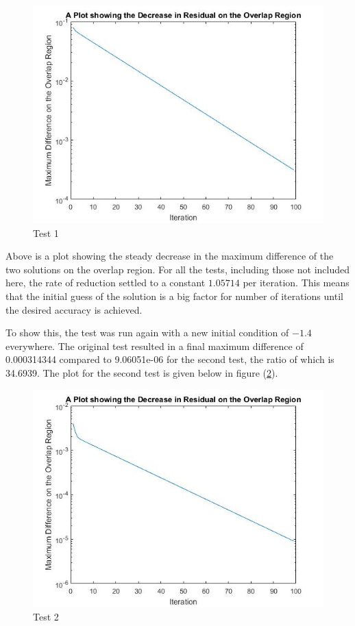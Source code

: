 \documentclass[11pt,a4paper,notitlepage]{article}
\begin{document}
\newpage


\begin{figure}[h] 
\centering
\includegraphics[width=.7\linewidth]{PoissonRes1.jpg}
\caption{Test 1}
\label{poisson.resplot}
\end{figure}

Above is a plot showing the steady decrease in the maximum difference of the two solutions on the overlap region. For all the tests, including those not included here, the rate of reduction settled to a constant $1.05714$ per iteration. This means that the initial guess of the solution is a big factor for number of iterations until the desired accuracy is achieved. 

To show this, the test was run again with a new initial condition of $-1.4$ everywhere. The original test resulted in a final maximum difference of 0.000314344 compared to 9.06051e-06 for the second test, the ratio of which is 34.6939. The plot for the second test is given below in figure (\ref{poisson.resplot2}).


\begin{figure}[h] 
\centering
\includegraphics[width=.7\linewidth]{PoissonRes2.jpg}
\caption{Test 2}
\label{poisson.resplot2}
\end{figure}
\end{document}
